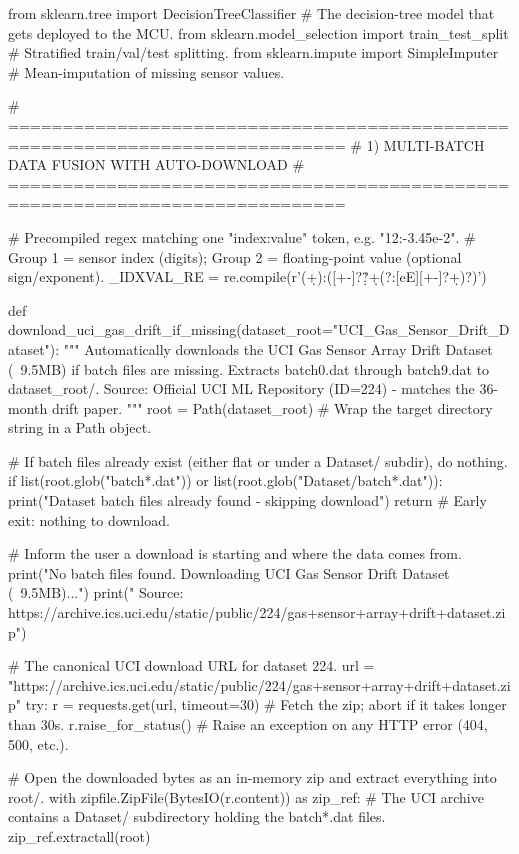 from sklearn.tree import DecisionTreeClassifier   # The decision-tree model that gets deployed to the MCU.
from sklearn.model_selection import train_test_split  # Stratified train/val/test splitting.
from sklearn.impute import SimpleImputer          # Mean-imputation of missing sensor values.

# =============================================================================
# 1) MULTI-BATCH DATA FUSION WITH AUTO-DOWNLOAD
# =============================================================================

# Precompiled regex matching one "index:value" token, e.g. "12:-3.45e-2".
# Group 1 = sensor index (digits); Group 2 = floating-point value (optional sign/exponent).
_IDXVAL_RE = re.compile(r'(\d+):([+-]?\d*\.?\d+(?:[eE][+-]?\d+)?)')

def download_uci_gas_drift_if_missing(dataset_root="UCI_Gas_Sensor_Drift_Dataset"):
    """
    Automatically downloads the UCI Gas Sensor Array Drift Dataset (~9.5MB)
    if batch files are missing. Extracts batch0.dat through batch9.dat to dataset_root/.
    Source: Official UCI ML Repository (ID=224) - matches the 36-month drift paper.
    """
    root = Path(dataset_root)              # Wrap the target directory string in a Path object.

    # If batch files already exist (either flat or under a Dataset/ subdir), do nothing.
    if list(root.glob("batch*.dat")) or list(root.glob("Dataset/batch*.dat")):
        print("Dataset batch files already found - skipping download")
        return                             # Early exit: nothing to download.

    # Inform the user a download is starting and where the data comes from.
    print("No batch files found. Downloading UCI Gas Sensor Drift Dataset (~9.5MB)...")
    print("   Source: https://archive.ics.uci.edu/static/public/224/gas+sensor+array+drift+dataset.zip")

    # The canonical UCI download URL for dataset 224.
    url = "https://archive.ics.uci.edu/static/public/224/gas+sensor+array+drift+dataset.zip"
    try:
        r = requests.get(url, timeout=30)  # Fetch the zip; abort if it takes longer than 30s.
        r.raise_for_status()               # Raise an exception on any HTTP error (404, 500, etc.).

        # Open the downloaded bytes as an in-memory zip and extract everything into root/.
        with zipfile.ZipFile(BytesIO(r.content)) as zip_ref:
            # The UCI archive contains a Dataset/ subdirectory holding the batch*.dat files.
            zip_ref.extractall(root)


